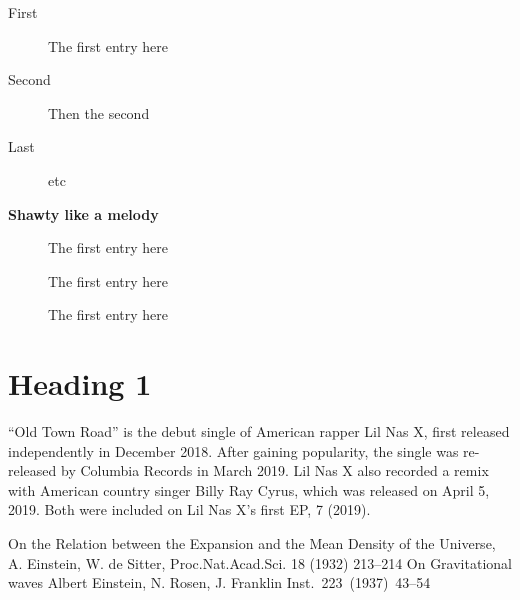 \documentclass[11pt]{article}
\begin{document}

\begin{description}
	\item[First] The first entry here
	\item[Second] Then the second
	\item[Last] etc
\end{description}

\textbf{Shawty like a melody}
\begin{description}
	\item[\color{red}{First}] The first entry here
	\item[\color{blue}{Second}] The first entry here
	\item[\color{black}{Last}] The first entry here
\end{description}

\section{Heading 1}
``Old Town Road'' is the debut single of American rapper Lil Nas X, first
released independently in December 2018\cite{albert1}. After gaining
popularity, the single was re-released by Columbia Records in March 2019. Lil
Nas X also recorded a remix with American country singer Billy Ray Cyrus, which
was released on April 5, 2019. Both were included on Lil Nas X's first EP, 7
(2019)\cite{einsteinRosen}.

\begin{thebibliography}{99}
	On the Relation between the Expansion and the Mean Density of the Universe, A.
	Einstein, W. de Sitter, Proc.Nat.Acad.Sci. 18 (1932) 213--214
	 On Gravitational waves Albert Einstein, N. Rosen, J.
	Franklin Inst.~223~(1937)~43--54
\end{thebibliography}
\end{document}
